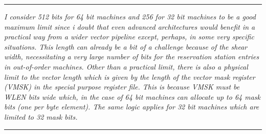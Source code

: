     \par\noindent\rule{\textwidth}{0.4pt}
    \textit{I consider 512 bits for 64 bit machines and 256 for 32 bit machines to be a good maximum limit since i doubt that even advanced architectures would benefit in a practical way from a wider vector pipeline except, perhaps, in some very specific situations. This length can already be a bit of a challenge because of the shear width, necessitating a very large number of bits for the reservation station entries in out-of-order machines. Other than a practical limit, there is also a physical limit to the vector length which is given by the length of the vector mask register (VMSK) in the special purpose register file. This is because VMSK must be WLEN bits wide which, in the case of 64 bit machines can allocate up to 64 mask bits (one per byte element). The same logic applies for 32 bit machines which are limited to 32 mask bits.}
    \par\noindent\rule{\textwidth}{0.4pt}